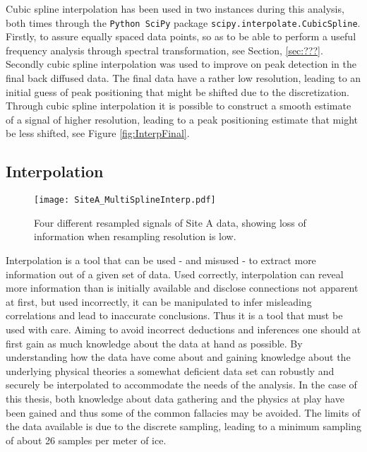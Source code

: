 \documentclass[../../CompleteThesis2/Complete_2ndDraft]{subfiles}
\begin{document}
Cubic spline interpolation has been used in two instances during this analysis, both times through the \lstinline[language=Python]|Python SciPy| package \lstinline[language=Python]|scipy.interpolate.CubicSpline|. Firstly, to assure equally spaced data points, so as to be able to perform a useful frequency analysis through spectral transformation, see Section, \ref{sec:???}. Secondly cubic spline interpolation was used to improve on peak detection in the final back diffused data. The final data have a rather low resolution, leading to an initial guess of peak positioning that might be shifted due to the discretization. Through cubic spline interpolation it is possible to construct a smooth estimate of a signal of higher resolution, leading to a peak positioning estimate that might be less shifted, see Figure \ref{fig:InterpFinal}.


\subsection[Interpolation][Interpolation]{Interpolation}
\label{Subsec:CompMeths_SplinesAndInterpolation_Interpolation}
\begin{figure}[h]
	\centering
	\texttt{[image: SiteA\_MultiSplineInterp.pdf]}
	\caption[Different resamplings of Site A.]{\small Four different resampled signals of Site A data, showing loss of information when resampling resolution is low.}
	\label{Fig:COMPMETH_SiteA_MultiSplineInterp}
\end{figure}
Interpolation is a tool that can be used - and misused - to extract more information out of a given set of data. Used correctly, interpolation can reveal more information than is initially available and disclose connections not apparent at first, but used incorrectly, it can be manipulated to infer misleading correlations and lead to inaccurate conclusions. Thus it is a tool that must be used with care. Aiming to avoid incorrect deductions and inferences one should at first gain as much knowledge about the data at hand as possible. By understanding how the data have come about and gaining knowledge about the underlying physical theories a somewhat deficient data set can robustly and securely be interpolated to accommodate the needs of the analysis. In the case of this thesis, both knowledge about data gathering and the physics at play have been gained and thus some of the common fallacies may be avoided. The limits of the data available is due to the discrete sampling, leading to a minimum sampling of about 26 samples per meter of ice.
\end{document}
